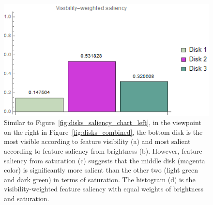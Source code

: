 \begin{figure}
\begin{minipage}{.45\textwidth}
		\subcaption{}
	\end{minipage}~
	\begin{minipage}{.45\textwidth}
		\includegraphics[width=1\linewidth]{images/disk_visibility_saliency_weighted_chart_right}
		\subcaption{}
	\end{minipage}
	\caption[Similar to Figure~\ref{fig:disks_saliency_chart_left}, in the viewpoint on the right in Figure~\ref{fig:disks_combined}, the bottom disk is the most visible according to feature visibility (a) and most salient according to feature saliency from brightness (b).]{Similar to Figure~\ref{fig:disks_saliency_chart_left}, in the viewpoint on the right in Figure~\ref{fig:disks_combined}, the bottom disk is the most visible according to feature visibility (a) and most salient according to feature saliency from brightness (b). However, feature saliency from saturation (c) suggests that the middle disk (magenta color) is significantly more salient than the other two (light green and dark green) in terms of saturation. The histogram (d) is the visibility-weighted feature saliency with equal weights of brightness and saturation.}
	\label{fig:disks_saliency_chart_right}
\end{figure}



